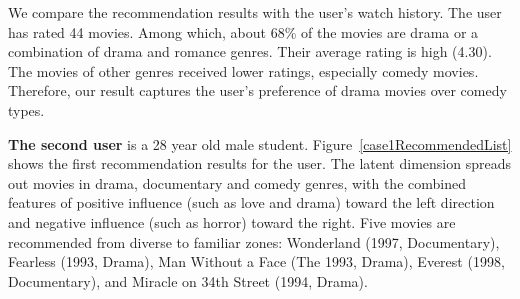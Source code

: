 \documentclass{vgtc}                          %
\begin{document}
We compare the recommendation results with the user's watch history.
The user has rated 44 movies.
Among which, about 68\% of the movies are drama or a combination of drama and romance genres. Their average rating is high (4.30).
The movies of other genres received lower ratings, especially comedy movies.
Therefore, our result captures the user's preference of drama movies over comedy types.






\textbf{The second user} is a 28 year old male student.
Figure~\ref{case1RecommendedList} shows the first recommendation results for the user. 
The latent dimension spreads out movies in drama, documentary and comedy genres, with the combined features of positive influence (such as love and drama) toward the left direction and negative influence (such as horror) toward the right. 
Five movies are recommended from diverse to familiar zones: Wonderland (1997, Documentary), Fearless (1993, Drama), Man Without a Face (The 1993, Drama), Everest (1998, Documentary), and Miracle on 34th Street (1994, Drama).
\end{document}
